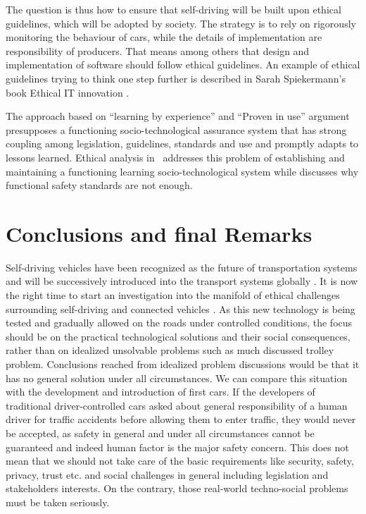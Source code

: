 The question is thus how to ensure that self-driving will be built upon ethical guidelines, which will be adopted by society. The strategy is to rely on rigorously monitoring the behaviour of cars, while the details of implementation are responsibility of producers. That means among others that design and implementation of software should follow ethical guidelines. An example of ethical guidelines trying to think one step further is described in Sarah Spiekermann's book Ethical IT innovation \cite{spiekermann2015ethical}. 

The approach based on \enquote{learning by experience} and \enquote{Proven in use} argument \cite{GovernmentNL2017,NationalInstruments2014a,DBLP:journals/corr/SchabeB15} presupposes a functioning socio-technological assurance system that has strong coupling among legislation, guidelines, standards and use and promptly adapts to lessons learned. Ethical analysis in~\cite{DodigCrnkovic2012, Thekkilakattil_7273594,Johnsen2017_7958474} addresses this problem of establishing and maintaining a functioning learning socio-technological system while \cite{Johnsen2017_7958474} discusses why functional safety standards are not enough.


\section{Conclusions and final Remarks}
\label{sec:Conclusions}
Self-driving vehicles have been recognized as the future of transportation systems and will be successively introduced into the transport systems globally \cite{EthicsCommission2017pr,Pillath2016,NHTSA2016PolicyUpdate}. It is now the right time to start an investigation into the manifold of ethical challenges surrounding self-driving and connected vehicles \cite{EthicsCommission2017b}. As this new technology is being tested and gradually allowed on the roads under controlled conditions, the focus should be on the practical technological solutions and their social consequences, rather than on idealized unsolvable problems such as much discussed trolley problem. Conclusions reached from idealized problem discussions would be that it has no general solution under all circumstances. We can compare this situation with the development and introduction of first cars. If the developers of traditional driver-controlled cars asked about general responsibility of a human driver for traffic accidents before allowing them to enter traffic, they would never be accepted, as safety in general and under all circumstances cannot be guaranteed and indeed human factor is the major safety concern. This does not mean that we should not take care of the basic requirements like security, safety, privacy, trust etc. and social challenges in general including legislation and stakeholders interests. On the contrary, those real-world techno-social problems must be taken seriously.

